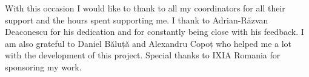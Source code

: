 \vspace*{7cm}
\begin{center}
With this occasion I would like to thank to all my coordinators for all their support and the hours spent supporting me.
I thank to Adrian-Răzvan Deaconescu for his dedication and for constantly being close with his feedback.
I am also grateful to Daniel Băluță and Alexandru Copoț who helped me a lot with the development of this project.
Special thanks to IXIA Romania for sponsoring my work.
\end{center}

